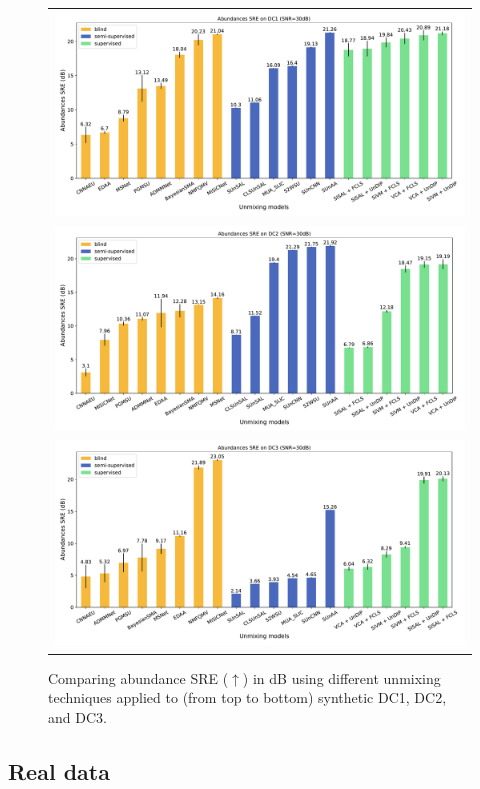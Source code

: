 \begin{figure}[h]
   \centering
   \begin{tabular}{c} 
   \includegraphics[width=.8\textwidth]{fichiers_latex/Chap4/figs/DC1_30.pdf}\\   
   \includegraphics[width=.8\textwidth]{fichiers_latex/Chap4/figs/DC2_30.pdf}
\\ 
   \includegraphics[width=.8\textwidth]{fichiers_latex/Chap4/figs/DC3_30.pdf}
 \end{tabular} 
   \caption{Comparing abundance SRE ($\uparrow$) in dB using different unmixing techniques applied to (from top to bottom) synthetic DC1, DC2, and DC3.}
   \label{fig:DC1_30dB_SRE}
\end{figure}

\subsection{Real data}

